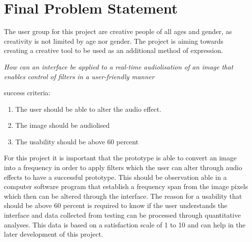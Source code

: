 \chapter{Final Problem Statement}\label{ch:finalproblem}

The user group for this project are creative people of all ages and gender, as creativity is not limited by age nor gender. 
The project is aiming towards creating a creative tool to be used as an additional method of expression. 


\textit{How can an interface be applied to a real-time audiolisation of an image that enables control of filters in a user-friendly manner}

success criteria:
\begin{enumerate}
\item The user should be able to alter the audio effect.
\item The image should be audiolised 
\item The usability should be above 60 percent
\end{enumerate}

For this project it is important that the prototype is able to convert an image into a frequency in order to apply filters which the user can alter through audio effects to have a successful prototype. This should be observation able in a computer software program that establish a frequency span from the image pixels which then can be altered through the interface. The reason for a usability that should be above 60 percent is required to know if the user understands the interface and data collected from testing can be processed through quantitative analyses. This data is based on a satisfaction scale of 1 to 10 and can help in the later development of this project. 


